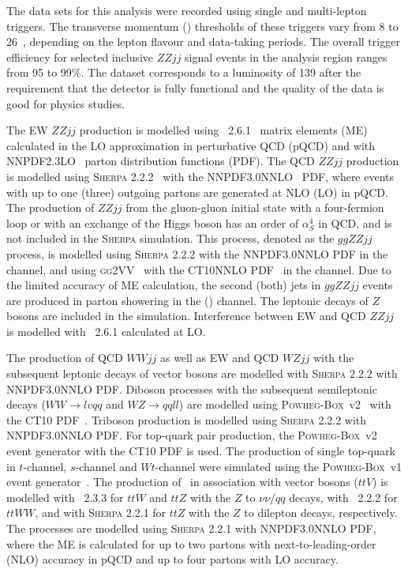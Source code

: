 The data sets for this analysis were recorded using single and multi-lepton triggers.
The transverse momentum (\pT) thresholds of these triggers vary from 8 to 26~\GeV{},
depending on the lepton flavour and data-taking periods.
The overall trigger efficiency for selected inclusive $ZZjj$ signal events in the analysis region ranges from 95 to 99\%{}.
The dataset corresponds to a luminosity of 139 \ifb after the requirement that the detector is fully functional and the quality of the data is good for physics studies.

The EW $ZZjj$ production is modelled using \MGMCatNLO~2.6.1~\cite{Alwall:2014hca} matrix elements (ME) calculated in the LO approximation
in perturbative QCD (pQCD) and with NNPDF2.3LO~\cite{Ball:2012cx} parton distribution functions (PDF).
The QCD $ZZjj$ production is modelled using \textsc{Sherpa} 2.2.2~\cite{Gleisberg:2008ta} with the NNPDF3.0NNLO~\cite{ball2015parton} PDF,
where events with up to one (three) outgoing partons are generated at NLO (LO) in pQCD.
The production of $ZZjj$ from the gluon-gluon initial state with a four-fermion loop or with an exchange of the Higgs boson has an order of $\alpha_{S}^{4}$ in QCD,
and is not included in the \textsc{Sherpa} simulation.
This process, denoted as the $ggZZjj$ process, is modelled using \textsc{Sherpa} 2.2.2 with the NNPDF3.0NNLO PDF in the \lllljj channel,
and using \textsc{gg2VV}~\cite{Kauer:2013qba} with the CT10NNLO PDF~\cite{Gao:2013xoa} in the \llvvjj channel.
Due to the limited accuracy of ME calculation, the second (both) jets in $ggZZjj$ events are produced in parton showering in the \lllljj (\llvvjj) channel.
The leptonic decays of $Z$ bosons are included in the simulation.
Interference between EW and QCD $ZZjj$ is modelled with \MGMCatNLO~2.6.1 calculated at LO. 

The production of QCD $WWjj$ as well as EW and QCD $WZjj$ with the subsequent leptonic decays of vector bosons are modelled with \textsc{Sherpa} 2.2.2 with NNPDF3.0NNLO PDF.
Diboson processes with the subsequent semileptonic decays ($WW \rightarrow lvqq$ and $WZ \rightarrow qqll$)
are modelled using \textsc{Powheg-Box}~v2~\cite{Frixione:2007nw} with the CT10 PDF~\cite{Lai:2010vv}.
Triboson production is modelled using \textsc{Sherpa} 2.2.2 with NNPDF3.0NNLO PDF.
For top-quark pair production, the \textsc{Powheg-Box}~v2 event generator with the CT10 PDF is used.
The production of single top-quark in $t$-channel, $s$-channel and $Wt$-channel were simulated using the \textsc{Powheg-Box}~v1 event generator~\cite{Alioli:2009je,Frederix:2012dh,Re:2010bp}.
The production of \ttbar~in association with vector bosons ($ttV$) is modelled with \MGMCatNLO~2.3.3 for $ttW$ and $ttZ$ with the $Z$ to $\nu\nu/qq$ decays,
with \MGMCatNLO~2.2.2 for $ttWW$, and with \textsc{Sherpa} 2.2.1 for $ttZ$ with the $Z$ to dilepton decays, respectively.
The \Zjet processes are modelled using \textsc{Sherpa} 2.2.1 with NNPDF3.0NNLO PDF, where the ME is calculated for up to two partons with next-to-leading-order (NLO) accuracy in pQCD and up to four partons with LO accuracy.

